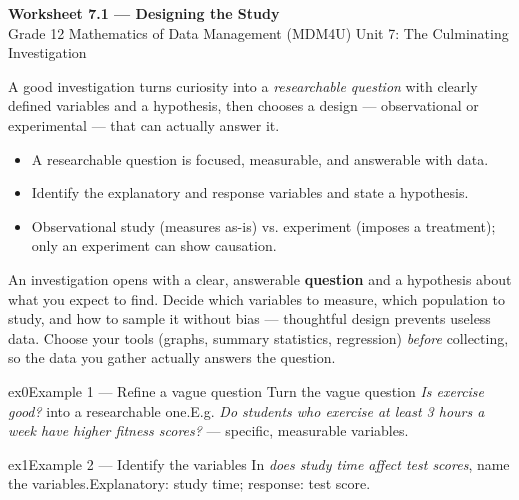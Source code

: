 \documentclass[11pt]{article}
\begin{document}
\begin{center}
{\LARGE\bfseries\color{titleblue}Worksheet 7.1 --- Designing the Study}\\[2pt]
{\small Grade 12 Mathematics of Data Management (MDM4U) \textperiodcentered{} Unit 7: The Culminating Investigation}
\end{center}

\begin{ideabox}
A good investigation turns curiosity into a \emph{researchable question} with clearly defined variables and a hypothesis, then chooses a design --- observational or experimental --- that can actually answer it.
\begin{itemize}[leftmargin=*,itemsep=2pt]
  \item A researchable question is focused, measurable, and answerable with data.
  \item Identify the explanatory and response variables and state a hypothesis.
  \item Observational study (measures as-is) vs. experiment (imposes a treatment); only an experiment can show causation.
\end{itemize}
\end{ideabox}

\begin{learnbox}
An investigation opens with a clear, answerable \textbf{question} and a hypothesis about what you expect to find.
Decide which variables to measure, which population to study, and how to sample it without bias — thoughtful design prevents useless data.
Choose your tools (graphs, summary statistics, regression) \emph{before} collecting, so the data you gather actually answers the question.
\end{learnbox}


\begin{example}{ex0}{Example 1 --- Refine a vague question}
Turn the vague question \emph{Is exercise good?} into a researchable one.\soln E.g. \emph{Do students who exercise at least 3 hours a week have higher fitness scores?} --- specific, measurable variables.
\end{example}

\begin{example}{ex1}{Example 2 --- Identify the variables}
In \emph{does study time affect test scores}, name the variables.\soln Explanatory: study time; response: test score.
\end{example}
\end{document}
